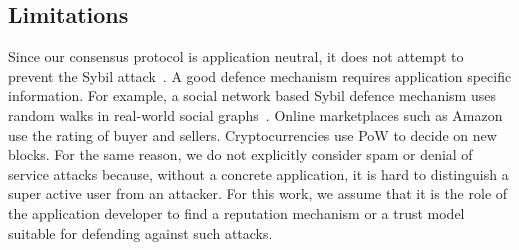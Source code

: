 \subsection*{Limitations}
Since our consensus protocol is application neutral, it does not attempt to prevent the Sybil attack~\cite{douceur2002sybil}.
A good defence mechanism requires application specific information.
For example, a social network based Sybil defence mechanism uses random walks in real-world social graphs~\cite{yu2006sybilguard}.
Online marketplaces such as Amazon use the rating of buyer and sellers.
Cryptocurrencies use PoW to decide on new blocks.
For the same reason, we do not explicitly consider spam or denial of service attacks because,
without a concrete application,
it is hard to distinguish a super active user from an attacker.
For this work,
we assume that it is the role of the application developer to find a reputation mechanism or a trust model suitable for defending against such attacks.



